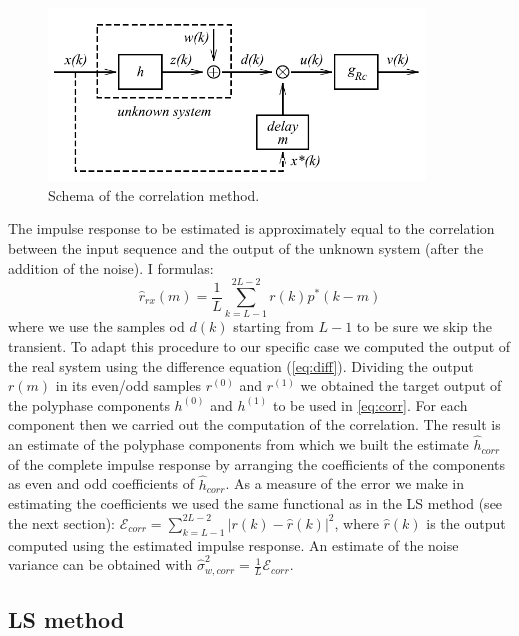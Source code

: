 \documentclass[a4paper,11.5pt]{article}
\begin{document}
\begin{figure}[ht]
	\begin{center}    
		\includegraphics[width=10cm]{figs/systemID.png}
		\caption{Schema of the correlation method.}
		\label{fig:systID}
	\end{center}
\end{figure} 

\noindent The impulse response to be estimated is approximately equal to the correlation between the input sequence and the output of the unknown system (after the addition of the noise). I formulas:
\begin{equation} \label{eq:corr}
\hat{r}_{rx}(m)= \frac{1}{L} \sum_{k=L-1}^{2L-2}r(k)p^*(k-m)
\end{equation}
\noindent where we use the samples od $d(k)$ starting from $L-1$ to be sure we skip the transient. To adapt this procedure to our specific case we computed the output of the real system using the difference equation (\ref{eq:diff}). Dividing the output $r(m)$ in its even/odd samples $r^{(0)}$ and $r^{(1)}$ we obtained the target output of the polyphase components $h^{(0)}$ and $h^{(1)}$ to be used in \ref{eq:corr}. For each component then we carried out the computation of the correlation. The result is an estimate of the polyphase components from which we built the estimate $\hat{h}_{corr}$ of the complete impulse response by arranging the coefficients of the components as even and odd coefficients of $\hat{h}_{corr}$. As a measure of the error we make in estimating the coefficients we used the same functional as in the LS method (see the next section): $\mathcal{E}_{corr} = \sum_{k=L-1}^{2L-2}|r(k)-\hat{r}(k)|^2$, where $\hat{r}(k)$ is the output computed using the estimated impulse response. An estimate of the noise variance can be obtained with $\hat{\sigma}_{w,corr}^2=\frac{1}{L}\mathcal{E}_{corr} $.

\subsection*{LS method}
\end{document}
